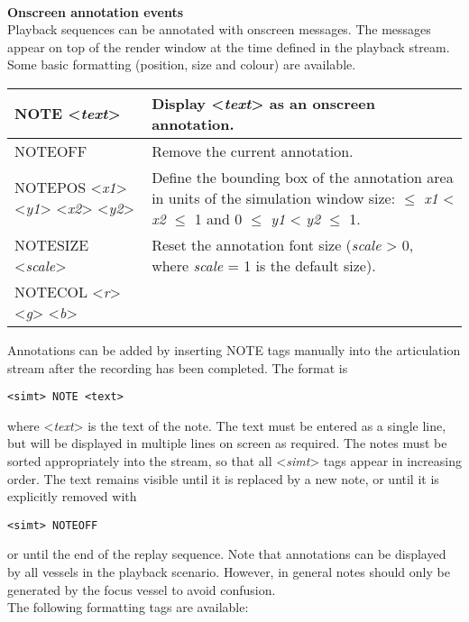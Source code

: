 \documentclass[Orbiter Technical Reference.tex]{subfiles}
\begin{document}
\noindent
\\
\textbf{Onscreen annotation events}\\
Playback sequences can be annotated with onscreen messages. The messages appear on top of the render window at the time defined in the playback stream. Some basic formatting (position, size and colour) are available.

\begin{table}[H]
	\centering
	\begin{tabularx}{\textwidth}{ |l|X| }
	\hline\rule{0pt}{2ex}
	NOTE <\textit{text}> & Display <\textit{text}> as an onscreen annotation.\\
	\hline\rule{0pt}{2ex}
	NOTEOFF & Remove the current annotation.\\
	\hline\rule{0pt}{2ex}
	NOTEPOS <\textit{x1}> <\textit{y1}> <\textit{x2}> <\textit{y2}> & Define the bounding box of the annotation area in units of the simulation window size:\newline
0 $\leq$ \textit{x1} < \textit{x2} $\leq$ 1 and 0 $\leq$ \textit{y1} < \textit{y2} $\leq$ 1.\\
	\hline\rule{0pt}{2ex}
	NOTESIZE <\textit{scale}> & Reset the annotation font size (\textit{scale} > 0, where \textit{scale} = 1 is the default size).\\
	\hline\rule{0pt}{2ex}
	NOTECOL <\textit{r}> <\textit{g}> <\textit{b}> &\\
	\hline
	\end{tabularx}
\end{table}

\noindent
Annotations can be added by inserting NOTE tags manually into the articulation stream after the recording has been completed. The format is

\begin{lstlisting}[language=OSFS]
<simt> NOTE <text>
\end{lstlisting}

\noindent
where <\textit{text}> is the text of the note. The text must be entered as a single line, but will be displayed in multiple lines on screen as required. The notes must be sorted appropriately into the stream, so that all <\textit{simt}> tags appear in increasing order. The text remains visible until it is replaced by a new note, or until it is explicitly removed with

\begin{lstlisting}[language=OSFS]
<simt> NOTEOFF
\end{lstlisting}

\noindent
or until the end of the replay sequence. Note that annotations can be displayed by all vessels in the playback scenario. However, in general notes should only be generated by the focus vessel to avoid confusion.\\
The following formatting tags are available:
\end{document}
